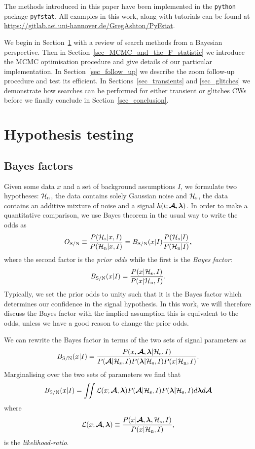 \documentclass[aps, prd, twocolumn, superscriptaddress, floatfix, showpacs, nofootinbib, longbibliography]{revtex4-1}
\begin{document}
The methods introduced in this paper have been implemented in the
\texttt{python} package \texttt{pyfstat}. All examples in this work, along with
tutorials can be found at
\url{https://gitlab.aei.uni-hannover.de/GregAshton/PyFstat}.

We begin in Section~\ref{sec_hypothesis_testing} with a review of search
methods from a Bayesian perspective. Then in
Section~\ref{sec_MCMC_and_the_F_statistic} we introduce the MCMC optimisation
procedure and give details of our particular implementation. In
Section~\ref{sec_follow_up} we describe the zoom follow-up procedure and test
its efficient. In Sections~\ref{sec_transients} and \ref{sec_glitches} we
demonstrate how searches can be performed for either transient or glitches CWs
before we finally conclude in Section~\ref{sec_conclusion}.

\section{Hypothesis testing}
\label{sec_hypothesis_testing}

\subsection{Bayes factors}
Given some data $x$ and a set of background assumptions $I$, we formulate
two hypotheses: $\mathcal{H}_{\rm n}$, the data contains solely Gaussian noise and $\mathcal{H}_{\rm s}$, the
data contains an additive mixture of noise and a signal $h(t; \boldsymbol{\mathcal{A}}, \boldsymbol{\mathbf{\lambda}})$.
In order to make a quantitative comparison, we use Bayes theorem in the usual
way to write the odds as
\begin{equation}
O_{\rm S/N} \equiv \frac{P(\mathcal{H}_{\rm s}| x, I)}{P(\mathcal{H}_{\rm n}| x, I)} =
B_{\rm S/N}(x| I) \frac{P(\mathcal{H}_{\rm s}| I)}{P(\mathcal{H}_{\rm n} | I)},
\end{equation}
where the second factor is the \emph{prior odds} while the first is the
\emph{Bayes factor}:
\begin{equation}
B_{\rm S/N}(x| I) = \frac{P(x| \mathcal{H}_{\rm s}, I)}{P(x| \mathcal{H}_{\rm n}, I)}.
\end{equation}
Typically, we set the prior odds to unity such that it is the Bayes factor
which determines our confidence in the signal hypothesis. In this work, we will
therefore discuss the Bayes factor with the implied assumption this is
equivalent to the odds, unless we have a good reason to change the prior odds.

We can rewrite the Bayes factor in terms of the two sets of signal parameters
as
\begin{equation}
B_{\rm S/N}(x| I) = \frac{P(x, \boldsymbol{\mathcal{A}}, \boldsymbol{\mathbf{\lambda}}|\mathcal{H}_{\rm s}, I)}
{P(\boldsymbol{\mathcal{A}}| \mathcal{H}_{\rm s}, I)P(\boldsymbol{\mathbf{\lambda}}| \mathcal{H}_{\rm s}, I)P(x| \mathcal{H}_{\rm n}, I)}.
\end{equation}
Marginalising over the two sets of parameters we find that
\begin{equation}
B_{\rm S/N}(x| I)= \iint
\mathcal{L}(x; \boldsymbol{\mathcal{A}}, \boldsymbol{\mathbf{\lambda}})
P(\boldsymbol{\mathcal{A}}| \mathcal{H}_{\rm s}, I)P(\boldsymbol{\mathbf{\lambda}}| \mathcal{H}_{\rm s}, I)
d\boldsymbol{\mathbf{\lambda}} d\boldsymbol{\mathcal{A}}
\label{eqn_full_bayes}
\end{equation}
where
\begin{equation}
\mathcal{L}(x; \boldsymbol{\mathcal{A}}, \boldsymbol{\mathbf{\lambda}}) \equiv \frac{P(x |\boldsymbol{\mathcal{A}}, \boldsymbol{\mathbf{\lambda}}, \mathcal{H}_{\rm s}, I)}{P(x| \mathcal{H}_{\rm n}, I)},
\label{eqn_likelihood}
\end{equation}
is the \emph{likelihood-ratio}.
\end{document}
